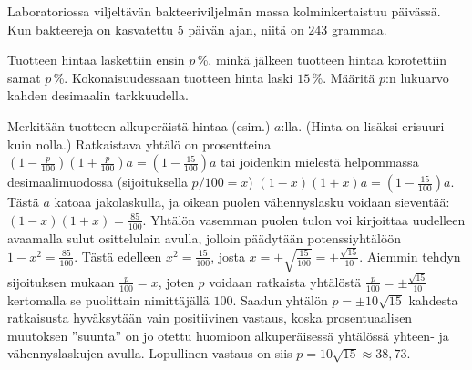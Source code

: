 	\begin{tehtava}
	 Laboratoriossa viljeltävän bakteeriviljelmän massa kolminkertaistuu päivässä. Kun bakteereja on kasvatettu $5$ päivän ajan, niitä on $243$ grammaa. 
	 \begin{vastaus}
	 \end{vastaus}
	\end{tehtava}

\begin{tehtava}
Tuotteen hintaa laskettiin ensin $p$\,\%, minkä jälkeen tuotteen hintaa korotettiin samat $p$\,\%. Kokonaisuudessaan tuotteen hinta laski $15$\,\%. Määritä $p$:n lukuarvo kahden desimaalin tarkkuudella.
	\begin{vastaus}
	Merkitään tuotteen alkuperäistä hintaa (esim.) $a$:lla. (Hinta on lisäksi erisuuri kuin nolla.) Ratkaistava yhtälö on prosentteina $(1-\frac{p}{100})(1+\frac{p}{100})a=(1-\frac{15}{100})a$ tai joidenkin mielestä helpommassa desimaalimuodossa (sijoituksella $p/100=x$) $(1-x)(1+x)a=(1-\frac{15}{100})a$. Tästä $a$ katoaa jakolaskulla, ja oikean puolen vähennyslasku voidaan sieventää: $(1-x)(1+x)=\frac{85}{100}$. Yhtälön vasemman puolen tulon voi kirjoittaa uudelleen avaamalla sulut osittelulain avulla, jolloin päädytään potenssiyhtälöön $1-x^2=\frac{85}{100}$. Tästä edelleen $x^2=\frac{15}{100}$, josta $x=\pm \sqrt{\frac{15}{100}}=\pm \frac{\sqrt{15}}{10}$. Aiemmin tehdyn sijoituksen mukaan $\frac{p}{100}=x$, joten $p$ voidaan ratkaista yhtälöstä $\frac{p}{100}=\pm \frac{\sqrt{15}}{10}$ kertomalla se puolittain nimittäjällä $100$. Saadun yhtälön $p=\pm 10\sqrt{15}$ kahdesta ratkaisusta hyväksytään vain positiivinen vastaus, koska prosentuaalisen muutoksen ''suunta'' on jo otettu huomioon alkuperäisessä yhtälössä yhteen- ja vähennyslaskujen avulla. Lopullinen vastaus on siis $p=10\sqrt{15}\approx 38,73$.
	\end{vastaus}
\end{tehtava}

\begin{tehtava}
\begin{vastaus}
\end{vastaus}
\end{tehtava}

\newpage